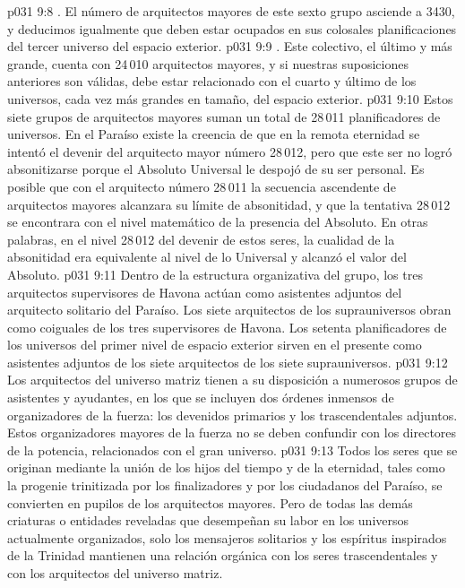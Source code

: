 \vs p031 9:8 . El número de arquitectos mayores de este sexto grupo asciende a 3430, y deducimos igualmente que deben estar ocupados en sus colosales planificaciones del tercer universo del espacio exterior.
\vs p031 9:9 . Este colectivo, el último y más grande, cuenta con 24\,010 arquitectos mayores, y si nuestras suposiciones anteriores son válidas, debe estar relacionado con el cuarto y último de los universos, cada vez más grandes en tamaño, del espacio exterior.
\vs p031 9:10 \pc Estos siete grupos de arquitectos mayores suman un total de 28\,011 planificadores de universos. En el Paraíso existe la creencia de que en la remota eternidad se intentó el devenir del arquitecto mayor número 28\,012, pero que este ser no logró absonitizarse porque el Absoluto Universal le despojó de su ser personal. Es posible que con el arquitecto número 28\,011 la secuencia ascendente de arquitectos mayores alcanzara su límite de absonitidad, y que la tentativa 28\,012 se encontrara con el nivel matemático de la presencia del Absoluto. En otras palabras, en el nivel 28\,012 del devenir de estos seres, la cualidad de la absonitidad era equivalente al nivel de lo Universal y alcanzó el valor del Absoluto.
\vs p031 9:11 \pc Dentro de la estructura organizativa del grupo, los tres arquitectos supervisores de Havona actúan como asistentes adjuntos del arquitecto solitario del Paraíso. Los siete arquitectos de los suprauniversos obran como coiguales de los tres supervisores de Havona. Los setenta planificadores de los universos del primer nivel de espacio exterior sirven en el presente como asistentes adjuntos de los siete arquitectos de los siete suprauniversos.
\vs p031 9:12 Los arquitectos del universo matriz tienen a su disposición a numerosos grupos de asistentes y ayudantes, en los que se incluyen dos órdenes inmensos de organizadores de la fuerza: los devenidos primarios y los trascendentales adjuntos. Estos organizadores mayores de la fuerza no se deben confundir con los directores de la potencia, relacionados con el gran universo.
\vs p031 9:13 Todos los seres que se originan mediante la unión de los hijos del tiempo y de la eternidad, tales como la progenie trinitizada por los finalizadores y por los ciudadanos del Paraíso, se convierten en pupilos de los arquitectos mayores. Pero de todas las demás criaturas o entidades reveladas que desempeñan su labor en los universos actualmente organizados, solo los mensajeros solitarios y los espíritus inspirados de la Trinidad mantienen una relación orgánica con los seres trascendentales y con los arquitectos del universo matriz.
